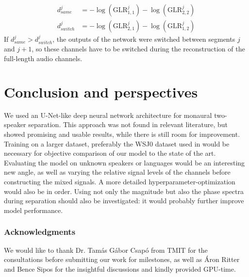 \documentclass{article}
\begin{document}
\begin{align}
    d_{same}^j &= -\log(\mathrm{GLR}^j_{1,1}) -\log(\mathrm{GLR}^j_{2,2}) \\
    d_{switch}^j &= -\log(\mathrm{GLR}^j_{2,1}) -\log(\mathrm{GLR}^j_{1,2})
\end{align}
If $d_{same}^j>d_{switch}^j$, the outputs of the network were switched between segments $j$ and $j+1$, so these channels have to be switched during the reconstruction of the full-length audio channels.

\section{Conclusion and perspectives}
We used an U-Net-like deep neural network architecture for monaural two-speaker separation. This approach was not found in relevant literature, but showed promising and usable results, while there is still room for improvement. Training on a larger dataset, preferably the WSJ0 \cite{wsj0} dataset used in \cite{YuKTJ16} would be necessary for objective comparison of our model to the state of the art. Evaluating the model on unknown speakers or languages would be an interesting new angle, as well as varying the relative signal levels of the channels before constructing the mixed signals. A more detailed hyperparameter-optimization would also be in order. Using not only the magnitude but also the phase spectra during separation should also be investigated: it would probably further improve model performance.
\subsubsection*{Acknowledgments}

We would like to thank Dr. Tamás Gábor Csapó from TMIT for the consultations before submitting our work for milestones, as well as Áron Ritter and Bence Sipos for the insightful discussions and kindly provided GPU-time.



\end{document}
